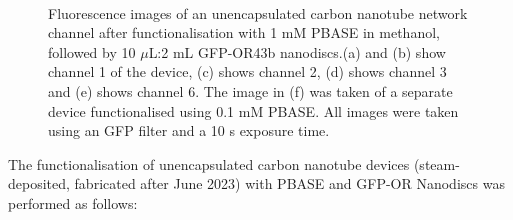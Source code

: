 \documentclass[
  a4paper,
]{scrbook}
\begin{document}
\begin{figure}
\begin{minipage}[t]{0.47\linewidth}
{}

\subcaption{\label{fig-PBASE-GFP-OR-ch6}}
\end{minipage}%
%
\begin{minipage}[t]{0.05\linewidth}

{\centering 

~

}

\end{minipage}%
%
\begin{minipage}[t]{0.47\linewidth}

{\centering 


}

\subcaption{\label{fig-PBASE-GFP-OR-0.1mM}}
\end{minipage}%

\caption{\label{fig-PBASE-GFP-ORs}Fluorescence images of an
unencapsulated carbon nanotube network channel after functionalisation
with 1 mM PBASE in methanol, followed by 10 \(\mu\)L:2 mL GFP-OR43b
nanodiscs.(a) and (b) show channel 1 of the device, (c) shows channel 2,
(d) shows channel 3 and (e) shows channel 6. The image in (f) was taken
of a separate device functionalised using 0.1 mM PBASE. All images were
taken using an GFP filter and a 10 s exposure time.}

\end{figure}

The functionalisation of unencapsulated carbon nanotube devices
(steam-deposited, fabricated after June 2023) with PBASE and GFP-OR
Nanodiscs was performed as follows:
\end{document}
